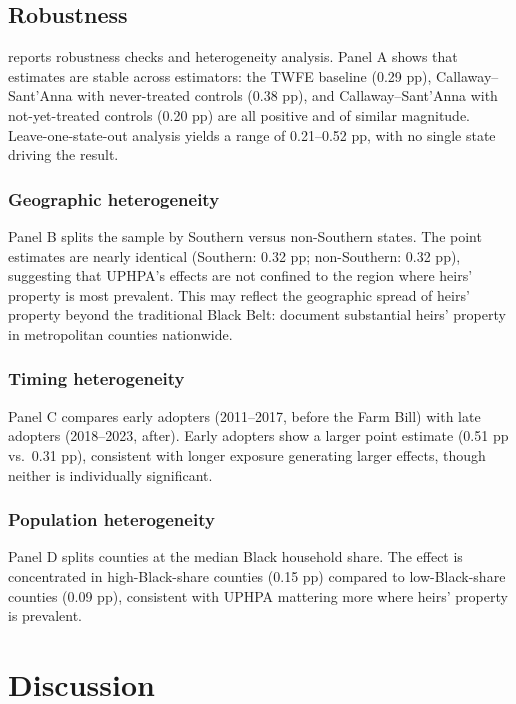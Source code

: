 \documentclass[12pt]{article}
\begin{document}
\subsection{Robustness}



 reports robustness checks and heterogeneity analysis. Panel A shows that estimates are stable across estimators: the TWFE baseline (0.29 pp), Callaway--Sant'Anna with never-treated controls (0.38 pp), and Callaway--Sant'Anna with not-yet-treated controls (0.20 pp) are all positive and of similar magnitude. Leave-one-state-out analysis yields a range of 0.21--0.52 pp, with no single state driving the result.

\subsubsection*{Geographic heterogeneity} Panel B splits the sample by Southern versus non-Southern states. The point estimates are nearly identical (Southern: 0.32 pp; non-Southern: 0.32 pp), suggesting that UPHPA's effects are not confined to the region where heirs' property is most prevalent. This may reflect the geographic spread of heirs' property beyond the traditional Black Belt: \citet{deaton2022} document substantial heirs' property in metropolitan counties nationwide.

\subsubsection*{Timing heterogeneity} Panel C compares early adopters (2011--2017, before the Farm Bill) with late adopters (2018--2023, after). Early adopters show a larger point estimate (0.51 pp vs.\ 0.31 pp), consistent with longer exposure generating larger effects, though neither is individually significant.

\subsubsection*{Population heterogeneity} Panel D splits counties at the median Black household share. The effect is concentrated in high-Black-share counties (0.15 pp) compared to low-Black-share counties (0.09 pp), consistent with UPHPA mattering more where heirs' property is prevalent.

\section{Discussion}
\end{document}
